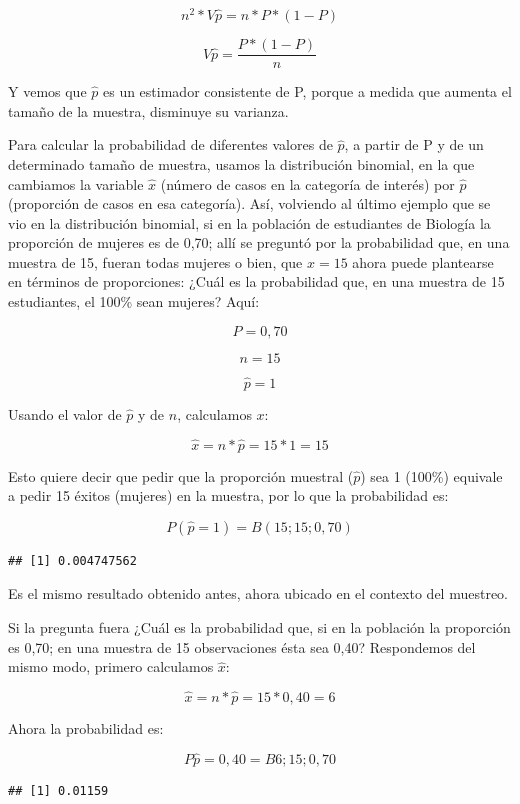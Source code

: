 \documentclass[]{book}
\begin{document}
\[n^{2}*V\widehat{p} = n*P*(1 - P)\]

\[V\widehat{p} = \frac{P*(1 - P)}{n}\]

Y vemos que \(\widehat{p}\) es un estimador consistente de P, porque a
medida que aumenta el tamaño de la muestra, disminuye su varianza.

Para calcular la probabilidad de diferentes valores de \(\widehat{p}\), a
partir de P y de un determinado tamaño de muestra, usamos la
distribución binomial, en la que cambiamos la variable \(\widehat{x}\)
(número de casos en la categoría de interés) por \(\widehat{p}\)
(proporción de casos en esa categoría). Así, volviendo al último ejemplo que se vio en la distribución binomial, si en la población de estudiantes de Biología la proporción de mujeres es de 0,70; allí se preguntó por la probabilidad que, en una muestra de 15, fueran todas mujeres o bien, que \(\widehat{x} = 15\) ahora puede plantearse en términos de proporciones: ¿Cuál es la probabilidad que, en una muestra de 15 estudiantes, el 100\% sean mujeres? Aquí:

\[P = 0,70\]

\[n = 15\]

\[\widehat{p} = 1\]

Usando el valor de \(\widehat{p}\) y de \(n\), calculamos \(x\):

\[\widehat{x} = n*\widehat{p} = 15*1 = 15\]

Esto quiere decir que pedir que la proporción muestral (\(\widehat{p}\)) sea 1 (100\%) equivale a pedir 15 éxitos (mujeres) en la muestra, por lo que la probabilidad es:

\[P(\widehat{p} = 1) = B( 15;15;0,70)\]

\begin{verbatim}
## [1] 0.004747562
\end{verbatim}

Es el mismo resultado obtenido antes, ahora ubicado en el contexto del
muestreo.

Si la pregunta fuera ¿Cuál es la probabilidad que, si en la población la proporción es 0,70; en una muestra de 15 observaciones ésta sea 0,40? Respondemos del mismo modo, primero calculamos \(\widehat{x}\):

\[\widehat{x} = n*\widehat{p} = 15*0,40 = 6\]

Ahora la probabilidad es:

\[P\widehat{p} = 0,40 = B6;15;0,70\]

\begin{verbatim}
## [1] 0.01159
\end{verbatim}
\end{document}
